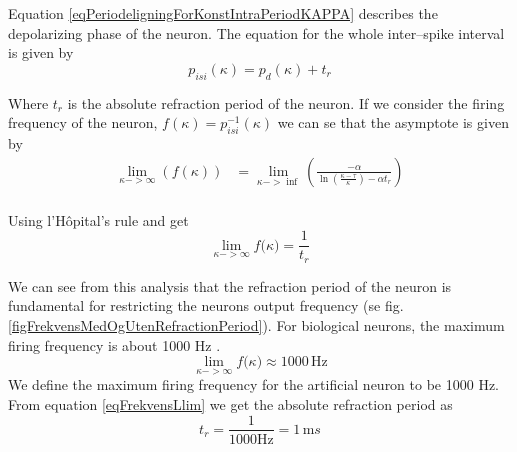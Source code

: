 Equation \eqref{eqPeriodeligningForKonstIntraPeriodKAPPA} describes the depolarizing phase of the neuron. %
The equation for the whole inter--spike interval is given by
\begin{equation}
	p_{isi}(\kappa) = p_d(\kappa) + t_r
\end{equation}

Where $t_r$ is the absolute refraction period of the neuron. %
If we consider the firing frequency of the neuron, $f(\kappa) = p_{isi}^{-1}(\kappa)$ we can se that the asymptote is given by
\begin{equation}
	\begin{split}
		\lim_{\kappa->\infty}(f(\kappa)) &= \lim_{\kappa->\inf}\left( \frac{-\alpha}{\ln \left( \frac{\kappa - \tau}{\kappa} \right) - \alpha t_r} \right) \\
	\end{split}
\end{equation}

Using l'Hôpital's rule %
and get %
\begin{equation}
	\label{eqFrekvensLlim}
	\lim_{\kappa->\infty}{ f(\kappa}) = \frac{1}{t_r}
\end{equation}



We can see from this analysis that the refraction period of the neuron is fundamental for restricting the neurons output frequency (se fig. \ref{figFrekvensMedOgUtenRefractionPeriod}).
For biological neurons, the maximum firing frequency is about 1000 Hz \cite{NeuroscienceExploringTheBrain3edKAP4}. %
\begin{equation}
	\lim_{\kappa->\infty}{ f(\kappa}) \approx 1000 \, \text{Hz}
\end{equation}
We define the maximum firing frequency for the artificial neuron to be 1000 Hz. From equation \ref{eqFrekvensLlim} we get the absolute refraction period as
\begin{equation}
	t_r = \frac{1}{1000 \text{Hz}} = 1 \, \text{m}s %
\end{equation}


